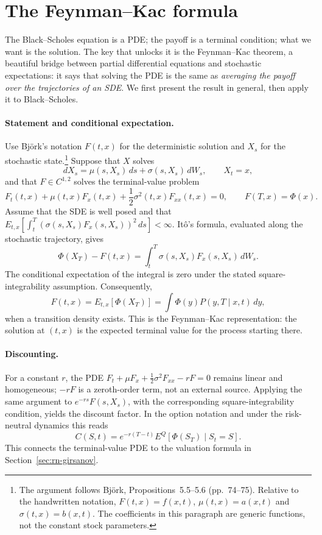 \section{The Feynman--Kac formula}\label{sec:feynman-kac}

The Black--Scholes equation is a PDE; the payoff is a terminal condition; what we want is the solution.
The key that unlocks it is the Feynman--Kac theorem, a beautiful bridge between partial differential equations and stochastic expectations: it says that solving the PDE is the same as \emph{averaging the payoff over the trajectories of an SDE}.
We first present the result in general, then apply it to Black--Scholes.

\paragraph*{Statement and conditional expectation.}
Use Bj\"ork's notation $F(t,x)$ for the deterministic solution and $X_s$ for the stochastic state.\footnote{The argument follows Bj\"ork\cite{Bjork2020}, Propositions~5.5--5.6 (pp.~74--75).
Relative to the handwritten notation, $F(t,x)=f(x,t)$, $\mu(t,x)=a(x,t)$ and $\sigma(t,x)=b(x,t)$.
The coefficients in this paragraph are generic functions, not the constant stock parameters.}
Suppose that $X$ solves
\[
 dX_s=\mu(s,X_s)\,ds+\sigma(s,X_s)\,dW_s,\qquad X_t=x,
\]
and that $F\in C^{1,2}$ solves the terminal-value problem
\begin{equation}\label{eq:feynman-kac-pde}
 F_t(t,x)+\mu(t,x)F_x(t,x)+\frac12\sigma^2(t,x)F_{xx}(t,x)=0,
 \qquad F(T,x)=\Phi(x).
\end{equation}
Assume that the SDE is well posed and that $E_{t,x}[\int_t^T(\sigma(s,X_s)F_x(s,X_s))^2\,ds]<\infty$.
It\^o's formula, evaluated along the stochastic trajectory, gives
\[
 \Phi(X_T)-F(t,x)=\int_t^T\sigma(s,X_s)F_x(s,X_s)\,dW_s.
\]
The conditional expectation of the integral is zero under the stated square-integrability assumption.
Consequently,
\begin{equation}\label{eq:feynman-kac-result}
 F(t,x)=E_{t,x}[\Phi(X_T)]
 =\int\Phi(y)P(y,T\mid x,t)\,dy,
\end{equation}
when a transition density exists.
This is the Feynman--Kac representation: the solution at $(t,x)$ is the expected terminal value for the process starting there.

\paragraph*{Discounting.}
For a constant $r$, the PDE $F_t+\mu F_x+\tfrac12\sigma^2F_{xx}-rF=0$ remains linear and homogeneous; $-rF$ is a zeroth-order term, not an external source.
Applying the same argument to $e^{-rs}F(s,X_s)$, with the corresponding square-integrability condition, yields the discount factor.
In the option notation and under the risk-neutral dynamics this reads
\begin{equation}\label{eq:feynman-kac-discount}
 C(S,t)=e^{-r(T-t)}E^Q[\Phi(S_T)\mid S_t=S].
\end{equation}
This connects the terminal-value PDE to the valuation formula in Section~\ref{sec:rn-girsanov}.

